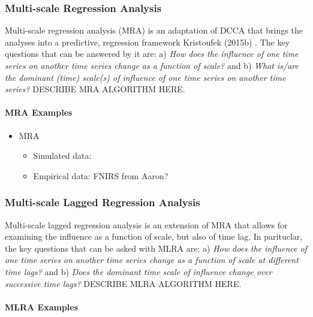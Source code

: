 \documentclass[
  english,
  man]{apa6}
\providecommand{\tightlist}{%
  \setlength{\itemsep}{0pt}\setlength{\parskip}{0pt}}
\let\oldparagraph\paragraph
\renewcommand{\paragraph}[1]{\oldparagraph{#1}\mbox{}}
\begin{document}
\hypertarget{multi-scale-regression-analysis}{%
\subsubsection{Multi-scale Regression Analysis}\label{multi-scale-regression-analysis}}

Multi-scale regression analysis (MRA) is an adaptation of DCCA that
brings the analyses into a predictive, regression framework
Kristoufek (2015b) . The key questions that can be answered by it are: a)
\emph{How does the influence of one time series on another time series change
as a function of scale?} and b) \emph{What is/are the dominant (time)
scale(s) of influence of one time series on another time series?}
DESCRIBE MRA ALGORITHM HERE.

\hypertarget{mra-examples}{%
\paragraph{MRA Examples}\label{mra-examples}}

\begin{itemize}
\item
  MRA

  \begin{itemize}
  \tightlist
  \item
    Simulated data:
  \item
    Empirical data: FNIRS from Aaron?
  \end{itemize}
\end{itemize}

\hypertarget{multi-scale-lagged-regression-analysis}{%
\subsubsection{Multi-scale Lagged Regression Analysis}\label{multi-scale-lagged-regression-analysis}}

Multi-scale lagged regression analysis is an extension of MRA that
allows for examining the influence as a function of scale, but also of
time lag. In parituclar, the key questions that can be asked with MLRA
are: a) \emph{How does the influence of one time series on another time
series change as a function of scale at different time lags?} and b)
\emph{Does the dominant time scale of influence change over successive time
lags?} DESCRIBE MLRA ALGORITHM HERE.

\hypertarget{mlra-examples}{%
\paragraph{MLRA Examples}\label{mlra-examples}}
\end{document}
